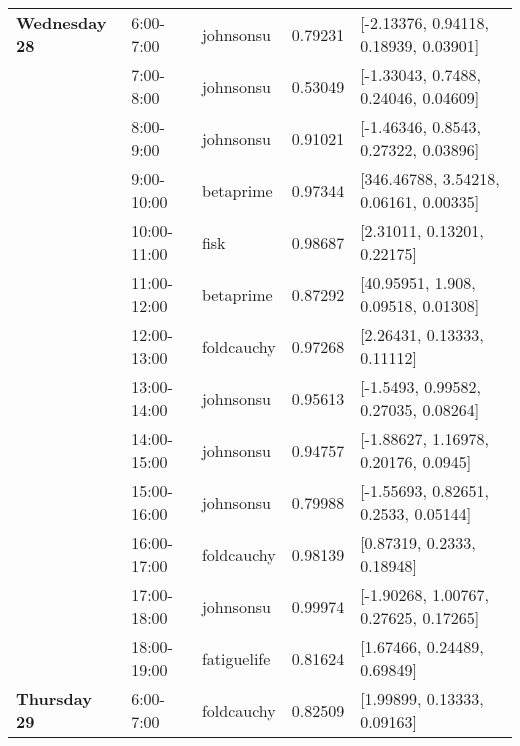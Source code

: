 \begin{longtable}[c]{llllp{5cm}}
\textbf{Wednesday 28} & 6:00-7:00             & johnsonsu             & 0.79231          & {[}-2.13376, 0.94118, 0.18939, 0.03901{]}              \\
\textbf{}             & 7:00-8:00             & johnsonsu             & 0.53049          & {[}-1.33043, 0.7488, 0.24046, 0.04609{]}               \\
\textbf{}             & 8:00-9:00             & johnsonsu             & 0.91021          & {[}-1.46346, 0.8543, 0.27322, 0.03896{]}               \\
\textbf{}             & 9:00-10:00             & betaprime             & 0.97344          & {[}346.46788, 3.54218, 0.06161, 0.00335{]}             \\
\textbf{}             & 10:00-11:00            & fisk                  & 0.98687          & {[}2.31011, 0.13201, 0.22175{]}                        \\
\textbf{}             & 11:00-12:00            & betaprime             & 0.87292          & {[}40.95951, 1.908, 0.09518, 0.01308{]}                \\
\textbf{}             & 12:00-13:00            & foldcauchy            & 0.97268          & {[}2.26431, 0.13333, 0.11112{]}                        \\
\textbf{}             & 13:00-14:00            & johnsonsu             & 0.95613          & {[}-1.5493, 0.99582, 0.27035, 0.08264{]}               \\
\textbf{}             & 14:00-15:00            & johnsonsu             & 0.94757          & {[}-1.88627, 1.16978, 0.20176, 0.0945{]}               \\
\textbf{}             & 15:00-16:00            & johnsonsu             & 0.79988          & {[}-1.55693, 0.82651, 0.2533, 0.05144{]}               \\
\textbf{}             & 16:00-17:00            & foldcauchy            & 0.98139          & {[}0.87319, 0.2333, 0.18948{]}                         \\
\textbf{}             & 17:00-18:00            & johnsonsu             & 0.99974          & {[}-1.90268, 1.00767, 0.27625, 0.17265{]}              \\
\textbf{}             & 18:00-19:00            & fatiguelife           & 0.81624          & {[}1.67466, 0.24489, 0.69849{]}                        \\ \hline
\textbf{Thursday 29}  & 6:00-7:00             & foldcauchy            & 0.82509          & {[}1.99899, 0.13333, 0.09163{]}                        \\

\end{longtable}
